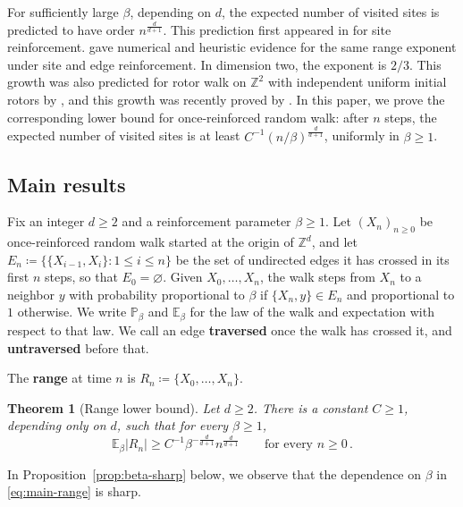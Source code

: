 \documentclass[11pt]{amsart}
\theoremstyle{plain}
\newtheorem{theorem}{Theorem}[section]
\theoremstyle{definition}
\newcommand{\Z}{\mathbb Z}
\renewcommand{\P}{\mathbb P}
\newcommand{\E}{\mathbb E}
\newcommand{\defn}[1]{\textbf{#1}}
\begin{document}
	For sufficiently large $\beta$, depending on $d$, the expected number of
	visited sites is predicted to have order $n^{\frac{d}{d+1}}$.
	This prediction first appeared in
	\citet*{OrdemannBerkolaikoHavlinBunde2000} for site reinforcement.
	\citet{FosterGrassbergerPaczuski2009} gave numerical and heuristic
	evidence for the same range exponent under site and edge reinforcement.
	In dimension two, the exponent is $2/3$. This growth was also predicted for
	rotor walk on $\Z^2$ with independent uniform initial rotors by
	\citet*{PriezzhevDharDharKrishnamurthy1996}, and this growth was recently proved by
	\citet[Theorem~1.1]{BouRabeePeres2026}.
	In this paper, we prove the corresponding lower bound for once-reinforced random walk: after $n$ steps, the expected number of visited sites is at least $C^{-1}(n/\beta)^{\frac{d}{d+1}}$, uniformly in
	$\beta\geq1$.

	\subsection{Main results}\label{ssec:main-results}

	Fix an integer $d\geq2$ and a reinforcement parameter $\beta\geq1$.  Let
	$(X_n)_{n\geq0}$ be once-reinforced random walk started at the origin of
	$\Z^d$, and let $E_n\coloneqq\{\{X_{i-1},X_i\}:1\leq i\leq n\}$ be the set of
	undirected edges it has crossed in its first $n$ steps, so that
	$E_0=\varnothing$. Given $X_0,\ldots,X_n$, the walk steps from $X_n$ to a neighbor $y$ with
	probability proportional to $\beta$ if $\{X_n,y\}\in E_n$ and proportional
	to $1$ otherwise. We write $\P_\beta$ and
	$\E_\beta$ for the law of the walk and expectation with respect to that law. We call an edge \defn{traversed} once the walk has crossed it, and
	\defn{untraversed} before that.

	The \defn{range} at time $n$ is $R_n\coloneqq\{X_0,\ldots,X_n\}$.

	\begin{theorem}[Range lower bound]\label{thm:main} Let
		$d\geq2$. There is a constant $C\geq1$, depending only on $d$, such that
		for every $\beta\geq1$,
		\begin{equation}\label{eq:main-range}
			\E_\beta|R_n|\geq C^{-1}\beta^{-\frac{d}{d+1}}n^{\frac{d}{d+1}}
			\qquad\text{for every }n\geq0\, .
		\end{equation}
	\end{theorem}
    In Proposition~\ref{prop:beta-sharp} below, we observe that the dependence
    on $\beta$ in \eqref{eq:main-range} is sharp. 
\end{document}
